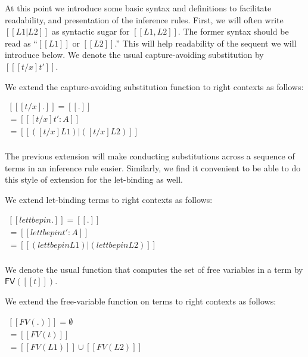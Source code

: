 \documentclass{article}
\begin{document}
At this point we introduce some basic syntax and definitions to
facilitate readability, and presentation of the inference rules.
First, we will often write $[[L1 | L2]]$ as syntactic sugar for
$[[L1,L2]]$.  The former syntax should be read as ``$[[L1]]$ or
$[[L2]]$.'' This will help readability of the sequent we will
introduce below.  We denote the usual capture-avoiding substitution by
$[[ [t/x]t']]$.

\begin{definition}
  \label{def:delta-sub}
  We extend the capture-avoiding substitution function to right
  contexts as follows:
  \begin{center}
    \begin{math}
      \begin{array}{lll}
        [[ [t/x] .]] = [[.]]\\
        [[ [t/x] (t' : A)]] = [[{[t/x]t'} : A]]\\
        [[ [t/x] (L1 | L2)]] = [[([t/x]L1) | ([t/x]L2)]]\\
      \end{array}
    \end{math}
  \end{center}
\end{definition}
The previous extension will make conducting substitutions across a
sequence of terms in an inference rule easier.  Similarly, we find
it convenient to be able to do this style of extension for the
let-binding as well.
\begin{definition}
  \label{def:delta-let}
  We extend let-binding terms to right contexts as follows:
  \begin{center}
    \begin{math}
      \begin{array}{lll}
        [[ let t be p in .]] = [[.]]\\
        [[ let t be p in (t' : A)]] = [[{let t be p in t'} : A]]\\
        [[ let t be p in (L1 | L2)]] = [[(let t be p in L1) | (let t be p in L2)]]\\
      \end{array}
    \end{math}
  \end{center}
\end{definition}
We denote the usual function that computes the set of free variables
in a term by $\mathsf{FV}([[t]])$.
\begin{definition}
  \label{def:delta-FV}
  We extend the free-variable function on terms to right contexts as
  follows:
  \begin{center}
    \begin{math}
      \begin{array}{lll}
        [[FV(.)]] = \emptyset\\
        [[FV(t : A)]] = [[FV(t)]]\\
        [[FV(L1 | L2)]] = [[FV(L1)]] \cup [[FV(L2)]]\\
      \end{array}
    \end{math}
  \end{center}
\end{definition}
\end{document}
